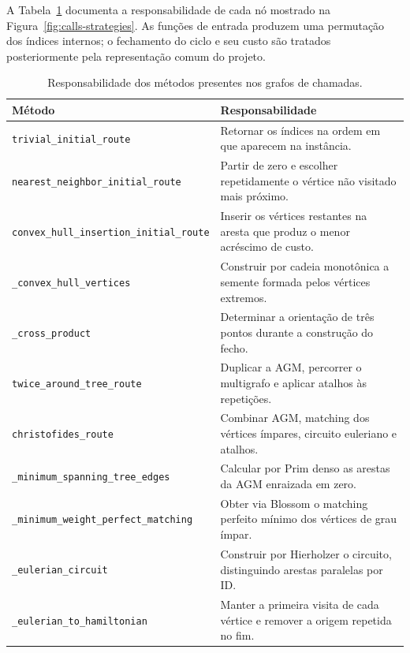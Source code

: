 \documentclass[12pt]{article}
\begin{document}
A Tabela~\ref{tab:strategy-call-methods} documenta a responsabilidade de cada
nó mostrado na Figura~\ref{fig:calls-strategies}. As funções de entrada
produzem uma permutação dos índices internos; o fechamento do ciclo e seu custo
são tratados posteriormente pela representação comum do projeto.

\begin{table}[H]
  \centering
  \caption{Responsabilidade dos métodos presentes nos grafos de chamadas.}
  \label{tab:strategy-call-methods}
  \scriptsize
  \begin{tabular}{p{}p{}}
    \hline
    Método & Responsabilidade \\
    \hline
    \texttt{trivial\_initial\_route} &
      Retornar os índices na ordem em que aparecem na instância. \\
    \texttt{nearest\_neighbor\_initial\_route} &
      Partir de zero e escolher repetidamente o vértice não visitado mais próximo. \\
    \texttt{convex\_hull\_insertion\_initial\_route} &
      Inserir os vértices restantes na aresta que produz o menor acréscimo de custo. \\
    \texttt{\_convex\_hull\_vertices} &
      Construir por cadeia monotônica a semente formada pelos vértices extremos. \\
    \texttt{\_cross\_product} &
      Determinar a orientação de três pontos durante a construção do fecho. \\
    \texttt{twice\_around\_tree\_route} &
      Duplicar a AGM, percorrer o multigrafo e aplicar atalhos às repetições. \\
    \texttt{christofides\_route} &
      Combinar AGM, matching dos vértices ímpares, circuito euleriano e atalhos. \\
    \texttt{\_minimum\_spanning\_tree\_edges} &
      Calcular por Prim denso as arestas da AGM enraizada em zero. \\
    \texttt{\_minimum\_weight\_perfect\_matching} &
      Obter via Blossom o matching perfeito mínimo dos vértices de grau ímpar. \\
    \texttt{\_eulerian\_circuit} &
      Construir por Hierholzer o circuito, distinguindo arestas paralelas por ID. \\
    \texttt{\_eulerian\_to\_hamiltonian} &
      Manter a primeira visita de cada vértice e remover a origem repetida no fim. \\
    \hline
  \end{tabular}
\end{table}
\end{document}
